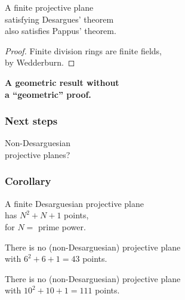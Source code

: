 \documentclass[14pt]{chalkfjord}
\newcommand{\clearbackgroundpicture}{\usebackgroundtemplate{}}
\begin{document}
\begin{frame}
  \begin{theorem}
    A finite projective plane \\
    \quad satisfying Desargues' theorem \\
    \quad also satisfies Pappus' theorem.
  \end{theorem}
  \pause
  \begin{proof}
    Finite division rings are finite fields,\\
    \quad by Wedderburn.
  \end{proof}
  \pause
  \vfill
  \textbf{A geometric result without\\
    \quad a ``geometric'' proof.}

\end{frame}

\begin{frame}[label=next-steps]
  \frametitle{Next steps}

  \vfill
  \Huge 
  \begin{center}
    Non-Desarguesian \\
    projective planes?
  \end{center}
  
  \vfill
\end{frame}

\begin{frame}
  \frametitle{Corollary}

  A finite Desarguesian projective plane \\
  \quad has $N^2 + N + 1$ points,\\
  \quad for $N = $ prime power.

  \vfill\pause

  \begin{theorem}
    There is no (non-Desarguesian) projective plane \\
    \quad with $6^2 + 6 + 1 = 43$ points.
  \end{theorem}

  \vfill\pause

  \begin{theorem}
    There is no (non-Desarguesian) projective plane \\
    \quad with $10^2 + 10 + 1 = 111$ points.
  \end{theorem}

\end{frame}

 \clearbackgroundpicture
\begin{frame}[label=why-me]
  \vfill
  \begin{center}
  \end{center}
  \vfill
\end{frame}
\end{document}
